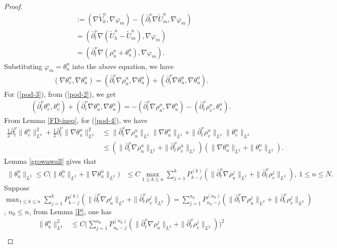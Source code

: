 \documentclass[11pt]{article}
\numberwithin{equation}{section}
\begin{document}
\begin{proof}
\begin{align*}
&:=(\nabla \widetilde{V}_h^n,\nabla\varphi_m)-(\bar\partial_t^\nu \nabla\widetilde{U}_m^n,\nabla\varphi_m)\\
&=(\bar\partial_t^\nu \nabla(\widetilde{U}_h^n-\widetilde{U}_m^n),\nabla\varphi_m)\\
&=(\bar\partial_t^\nu \nabla (\rho_u^n+\theta_u^n),\nabla\varphi_m).
\end{align*}
Substituting $\varphi_m=\theta_u^n$ into the above equation, we have
\begin{align}\label{pod-3}
(\nabla \theta_v^n,\nabla\theta_u^n) 
=(\bar\partial_t^\nu \nabla \rho_u^n,\nabla\theta_u^n)+(\bar\partial_t^\nu \nabla \theta_u^n,\nabla\theta_u^n).
\end{align}
For (\ref{pod-3}), from (\ref{pod-2}), we get
\begin{align}\label{pod-4}
(\bar\partial_t^\nu\theta_v^n,\theta_v^n)+(\bar\partial_t^\nu \nabla \theta_u^n,\nabla\theta_u^n)=-(\bar\partial_t^\nu \nabla \rho_u^n,\nabla\theta_u^n)-(\bar\partial_t^\nu \rho_v^n,\theta_v^n).
\end{align}
From Lemma \ref{FD-ineq}, for (\ref{pod-4}), we have
\begin{align*}
\frac12\bar\partial_t^\nu\|\theta_v^n\|_{L^2}^2+\frac12\bar\partial_t^\nu \|\nabla \theta_u^n\|_{L^2}^2
&\leq \|\bar\partial_t^\nu \nabla \rho_u^n\|_{L^2}\|\nabla\theta_u^n\|_{L^2}+\|\bar\partial_t^\nu \rho_v^n\|_{L^2}\|\theta_v^n\|_{L^2}\\
&\leq (\|\bar\partial_t^\nu \nabla \rho_u^n\|_{L^2}+\|\bar\partial_t^\nu \rho_v^n\|_{L^2})(\|\nabla\theta_u^n\|_{L^2}+\|\theta_v^n\|_{L^2}).
\end{align*}
Lemma \ref{grownwall} gives that 
\begin{align*}
\|\theta_u^n\|_{L^2}\leq C\big(\|\theta_v^n\|_{L^2}+ \|\nabla \theta_u^n\|_{L^2}\big) 
&\leq C\max_{1\leq k\leq n}\sum_{j=1}^kP_{k-j}^{(k)}(\|\bar\partial_t^\nu \nabla \rho_u^j\|_{L^2}+\|\bar\partial_t^\nu \rho_v^j\|_{L^2}),~1\leq n\leq N.
\end{align*}
Suppose $\max_{1\leq k\leq n}\sum_{j=1}^kP_{k-j}^{(k)}(\|\bar\partial_t^\nu \nabla \rho_u^j\|_{L^2}+\|\bar\partial_t^\nu \rho_v^j\|_{L^2})=\sum_{j=1}^{n_0}P_{n_0-j}^{({n_0})}(\|\bar\partial_t^\nu \nabla \rho_u^j\|_{L^2}+\|\bar\partial_t^\nu \rho_v^j\|_{L^2})$, $n_0\leq n$, from Lemma \ref{P}, one has
\begin{align*}
\|\theta_u^n\|_{L^2}^2
&\leq C\bigg(\sum_{j=1}^{n_0}P_{n_0-j}^{({n_0})}(\|\bar\partial_t^\nu \nabla \rho_u^j\|_{L^2}+\|\bar\partial_t^\nu \rho_v^j\|_{L^2})\bigg)^2\\

\end{align*}
\end{proof}
\end{document}
